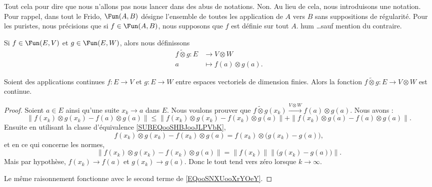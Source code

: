 Tout cela pour dire que nous n'allons pas nous lancer dans des abus de notations. Non. Au lieu de cela, nous introduisons une notation. Pour rappel, dans tout le Frido, \( \Fun(A,B)\) désigne l'ensemble de toutes les application de \( A\) vers \( B\) sans suppositions de régularité. Pour les puristes, nous précisions que si \( f\in\Fun(A,B)\), nous supposons que \( f\) est définie sur tout \( A\). hum \ldots sauf mention du contraire.
\begin{definition}      \label{DEFooMVNDooFWFtRn}
	Si \( f\in \Fun(E,V)\) et \( g\in \Fun(E,W)\), alors nous définissons
	\begin{equation}
		\begin{aligned}
			f\tilde\otimes g\colon E & \to V\otimes W            \\
			a                        & \mapsto f(a)\otimes g(a).
		\end{aligned}
	\end{equation}
\end{definition}

\begin{proposition}     \label{PROPooCRVXooEGxdZl}
	Soient des applications continues \( f\colon E\to V\) et \( g\colon E\to W\) entre espaces vectoriels de dimension finies. Alors la fonction \( f\tilde\otimes g\colon E\to V\otimes W\) est continue.
\end{proposition}

\begin{proof}
	Soient \( a\in E\) ainsi qu'une suite \( x_k\to a\) dans \( E\). Nous voulons prouver que \( f\tilde\otimes g(x_k)\stackrel{V\otimes W}{\longrightarrow}f(a)\otimes g(a)\). Nous avons :
	\begin{equation}        \label{EQooSNXUooXrYOeY}
		\| f(x_k)\otimes g(x_k)-f(a)\otimes g(a) \|\leq \| f(x_k)\otimes g(x_k)-f(x_k)\otimes g(a) \|+\| f(x_k)\otimes g(a)-f(a)\otimes g(a) \|.
	\end{equation}
	Ensuite en utilisant la classe d'équivalence \eqref{SUBEQooSHBJooJLPVbK},
	\begin{equation}
		f(x_k)\otimes g(x_k)-f(x_k)\otimes g(a)=f(x_k)\otimes \big( g(x_k)-g(a) \big),
	\end{equation}
	et en ce qui concerne les normes,
	\begin{equation}
		\|   f(x_k)\otimes g(x_k)-f(x_k)\otimes g(a)\|  =\|f(x_k)\|  \| \big( g(x_k)-g(a) \big)\|.
	\end{equation}
	Mais par hypothèse, \( f(x_k)\to f(a)\) et \( g(x_k)\to g(a)\). Donc le tout tend vers zéro lorsque \( k\to \infty\).

	Le même raisonnement fonctionne avec le second terme de \eqref{EQooSNXUooXrYOeY}.
\end{proof}

